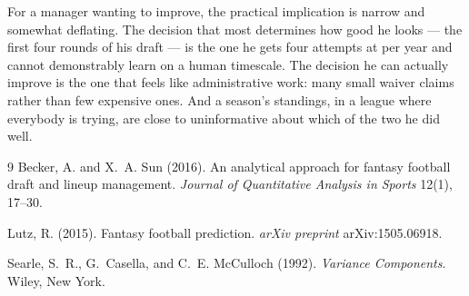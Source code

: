 \documentclass[11pt]{article}
\begin{document}
For a manager wanting to improve, the practical implication is narrow and
somewhat deflating. The decision that most determines how good he looks --- the
first four rounds of his draft --- is the one he gets four attempts at per year
and cannot demonstrably learn on a human timescale. The decision he can actually
improve is the one that feels like administrative work: many small waiver claims
rather than few expensive ones. And a season's standings, in a league where
everybody is trying, are close to uninformative about which of the two he did
well.

\begin{thebibliography}{9}
Becker, A. and X.~A. Sun (2016).
\newblock An analytical approach for fantasy football draft and lineup management.
\newblock \emph{Journal of Quantitative Analysis in Sports} 12(1), 17--30.

Lutz, R. (2015).
\newblock Fantasy football prediction.
\newblock \emph{arXiv preprint} arXiv:1505.06918.

Searle, S.~R., G.~Casella, and C.~E. McCulloch (1992).
\newblock \emph{Variance Components}.
\newblock Wiley, New York.
\end{thebibliography}
\end{document}

